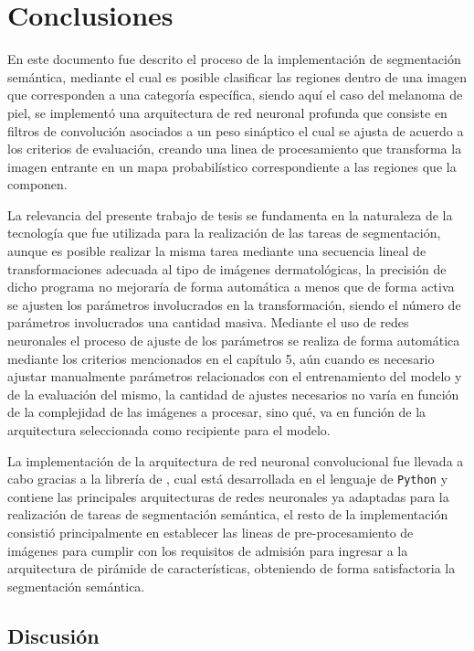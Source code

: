 \chapter{Conclusiones}

En este documento fue descrito el proceso de la implementación de segmentación semántica, mediante el cual es posible clasificar las regiones dentro de una imagen que corresponden a una categoría específica, siendo aquí el caso del melanoma de piel, se implementó una arquitectura de red neuronal profunda que consiste en filtros de convolución asociados a un peso sináptico el cual se ajusta de acuerdo a los criterios de evaluación, creando una linea de procesamiento que transforma la imagen entrante en un mapa probabilístico correspondiente a las regiones que la componen.

La relevancia del presente trabajo de tesis se fundamenta en la naturaleza de la tecnología que fue utilizada para la realización de las tareas de segmentación, aunque es posible realizar la misma tarea mediante una secuencia lineal de transformaciones adecuada al tipo de imágenes dermatológicas, la precisión de dicho programa no mejoraría de forma automática a menos que de forma activa se ajusten los parámetros involucrados en la transformación, siendo el número de parámetros involucrados una cantidad masiva. Mediante el uso de redes neuronales el proceso de ajuste de los parámetros se realiza de forma automática mediante los criterios mencionados en el capítulo 5, aún cuando es necesario ajustar manualmente parámetros relacionados con el entrenamiento del modelo y de la evaluación del mismo, la cantidad de ajustes necesarios no varía en función de la complejidad de las imágenes a procesar, sino qué, va en función de la arquitectura seleccionada como recipiente para el modelo.

La implementación de la arquitectura de red neuronal convolucional fue llevada a cabo gracias a la librería de \citet{Yakubovskiy:2019}, cual está desarrollada en el lenguaje de \texttt{Python} y contiene las principales arquitecturas de redes neuronales ya adaptadas para la realización de tareas de segmentación semántica, el resto de la implementación consistió principalmente en establecer las lineas de pre-procesamiento de imágenes para cumplir con los requisitos de admisión para ingresar a la arquitectura de pirámide de características, obteniendo de forma satisfactoria la segmentación semántica.

\section{Discusión}


